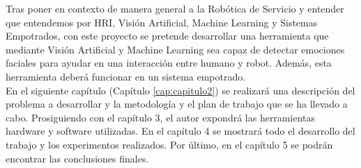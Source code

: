Tras poner en contexto de manera general a la Robótica de Servicio y entender que entendemos por HRI, Visión Artificial, Machine Learning y Sistemas Empotrados, con este proyecto se pretende desarrollar una herramienta que mediante Visión Artificial y Machine Learning sea capaz de detectar emociones faciales para ayudar en una interacción entre humano y robot. Además, esta herramienta deberá funcionar en un sistema empotrado.\\

En el siguiente capítulo (Capítulo \ref{cap:capitulo2}) se realizará una descripción del problema a desarrollar y la metodología y el plan de trabajo que se ha llevado a cabo. Prosiguiendo con el capítulo 3, el autor expondrá las herramientas hardware y software utilizadas. En el capítulo 4 se mostrará todo el desarrollo del trabajo y los experimentos realizados. Por último, en el capítulo 5 se podrán encontrar las conclusiones finales.






